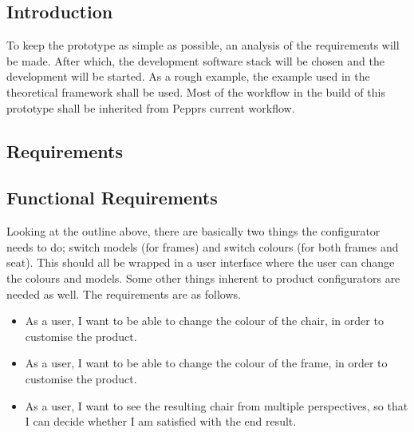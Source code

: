 \subsection{Introduction}
To keep the prototype as simple as possible, an analysis of the requirements will be made. After which, the development software stack will be chosen and the development will be started. As a rough example, the example used in the theoretical framework shall be used. Most of the workflow in the build of this prototype shall be inherited from Pepprs current workflow.


\subsection{Requirements}

\subsection{Functional Requirements}
Looking at the outline above, there are basically two things the configurator needs to do; switch models (for frames) and switch colours (for both frames and seat). This should all be wrapped in a user interface where the user can change the colours and models. Some other things inherent to product configurators are needed as well. The requirements are as follows.

\begin{itemize}
	\item As a user, I want to be able to change the colour of the chair, in order to customise the product.
	\item As a user, I want to be able to change the colour of the frame, in order to customise the product.
	\item As a user, I want to see the resulting chair from multiple perspectives, so that I can decide whether I am satisfied with the end result.
\end{itemize}

